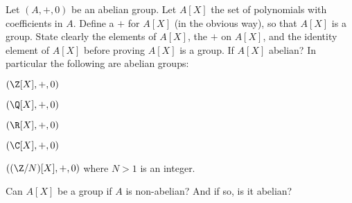   Let $(A, +, 0)$ be an abelian group.
  Let $A[X]$ the set of polynomials with
  coefficients in $A$.
  Define a $+$ for $A[X]$ (in the obvious way), so that $A[X]$ is a group.
  State clearly the elements of $A[X]$, the $+$ on $A[X]$,
  and the identity element of $A[X]$ before proving $A[X]$ is a group.
  If $A[X]$ abelian?
  In particular the following are abelian groups:
  \begin{myenum}
  \item $(\Z[X], +, 0)$
  \item $(\Q[X], +, 0)$
  \item $(\R[X], +, 0)$
  \item $(\C[X], +, 0)$
  \item $((\Z/N)[X], +, 0)$ where $N > 1$ is an integer.  
  \end{myenum}
  Can $A[X]$ be a group if $A$ is non-abelian?
  And if so, is it abelian?

